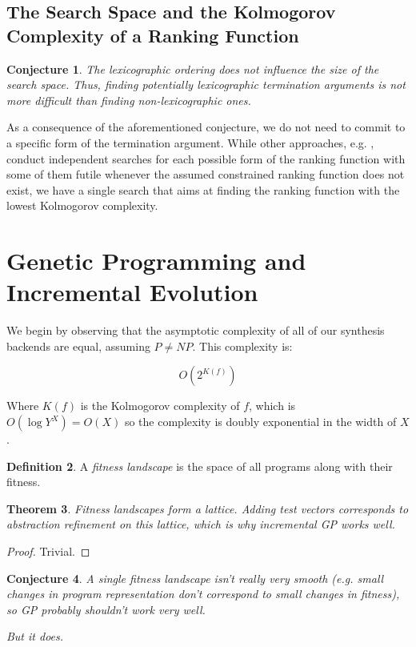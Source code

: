 \documentclass[preprint]{sigplanconf}
\newtheorem{theorem}{Theorem}
\newtheorem{conjecture}[theorem]{Conjecture}
\theoremstyle{definition}
\newtheorem{definition}[theorem]{Definition}
\begin{document}
\subsection{The Search Space and the Kolmogorov Complexity of a Ranking Function}
\begin{conjecture}
The lexicographic ordering does not influence the size of the search space. Thus, finding potentially lexicographic termination arguments is not more difficult than finding non-lexicographic ones.   
\end{conjecture}

As a consequence of the aforementioned conjecture, we do not need to commit to a specific form of the termination argument. While other approaches, e.g. \cite{DBLP:conf/tacas/LeikeH14}, 
conduct independent searches for each possible form of the ranking function with some of them futile whenever the assumed constrained ranking function does not exist, we have a single search that aims at finding the ranking function with the lowest Kolmogorov complexity. 
\fi
%
%


\section{Genetic Programming and Incremental Evolution}

We begin by observing that the asymptotic complexity of all of our synthesis
backends are equal, assuming $P \neq NP$.  This complexity is:

$$O\left(2^{K(f)}\right)$$

Where $K(f)$ is the Kolmogorov complexity of $f$, which is $O(\log Y^X) = O(X)$
so the complexity is doubly exponential in the width of $X$.

\begin{definition}
 A \emph{fitness landscape} is the space of all programs along with their fitness.
\end{definition}

\begin{theorem}
 Fitness landscapes form a lattice.  Adding test vectors corresponds to abstraction refinement on this
 lattice, which is why incremental GP works well.
\end{theorem}

\begin{proof}
 Trivial.
\end{proof}


\begin{conjecture}
 A single fitness landscape isn't really very smooth (e.g. small changes in program representation
 don't correspond to small changes in fitness), so GP probably shouldn't work very well.

 But it does.
\end{conjecture}
\end{document}
